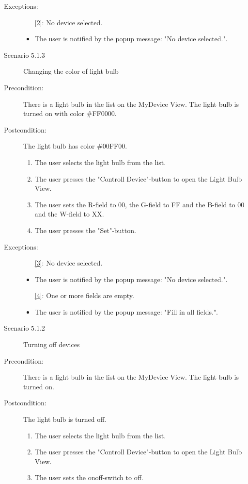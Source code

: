 \documentclass[a4paper]{article}
\begin{document}
\begin{description}
\item[Exceptions:]

\begin{itemize}
\item [\ref{2}:] No device selected.
\item The user is notified by the popup message: "No device selected.".
\end{itemize}

\item[]

\item[Scenario 5.1.3] Changing the color of light bulb
\item[Precondition:] There is a light bulb in the list on the MyDevice View. The light bulb is turned on with color \#FF0000.
\item[Postcondition:] The light bulb has color \#00FF00.
\begin{enumerate}
\item The user selects the light bulb from the list.
\item \label{3} The user presses the "Controll Device"-button to open the Light Bulb View.
\item  \label{4} The user sets the R-field to 00, the G-field to FF and the B-field to 00 and the W-field to XX.
\item The user presses the "Set"-button.

\end{enumerate}

\item[Exceptions:]
\item[]

\begin{itemize}
\item [\ref{3}:] No device selected.
\item The user is notified by the popup message: "No device selected.".
\item [\ref{4}:] One or more fields are empty.
\item The user is notified by the popup message: "Fill in all fields.".

\end{itemize}

\item[]

\item[Scenario 5.1.2] Turning off devices
\item[Precondition:] There is a light bulb in the list on the MyDevice View. The light bulb is turned on.
\item[Postcondition:] The light bulb is turned off.
\begin{enumerate}
\item The user selects the light bulb from the list.
\item \label{5} The user presses the "Controll Device"-button to open the Light Bulb View.
\item  The user sets the onoff-switch to off.
\end{enumerate}


\end{description}
\end{document}
